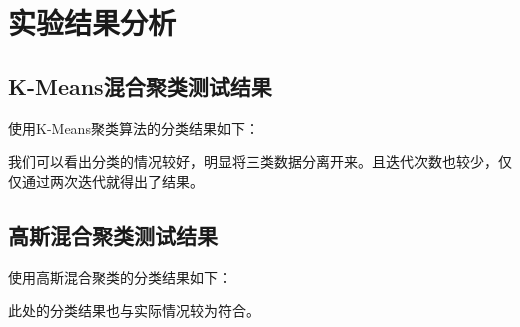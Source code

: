 \documentclass[12pt]{article}
\begin{document}
\section{实验结果分析}
\subsection{K-Means混合聚类测试结果}
使用K-Means聚类算法的分类结果如下：
\begin{figure}[H]
    \centering
\end{figure}
我们可以看出分类的情况较好，明显将三类数据分离开来。且迭代次数也较少，仅仅通过两次迭代就得出了结果。
\subsection{高斯混合聚类测试结果}
使用高斯混合聚类的分类结果如下：
\begin{figure}[H]
    \centering
\end{figure}
此处的分类结果也与实际情况较为符合。
\end{document}

